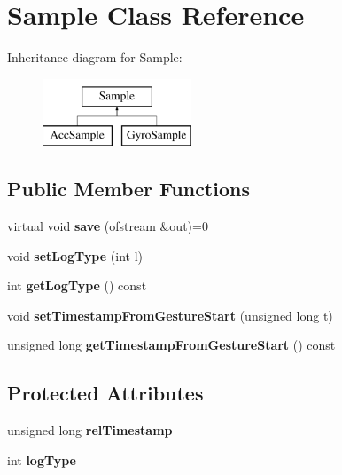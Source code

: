 \hypertarget{class_sample}{\section{\-Sample \-Class \-Reference}
\label{class_sample}
}
\-Inheritance diagram for \-Sample\-:\begin{figure}[H]
\begin{center}
\leavevmode
\includegraphics[height=2.000000cm]{class_sample}
\end{center}
\end{figure}
\subsection*{\-Public \-Member \-Functions}
\begin{DoxyCompactItemize}
\item 
\hypertarget{class_sample_a4f65c4a8bb86396782450121c7dc5ba5}{virtual void {\bfseries save} (ofstream \&out)=0}\label{class_sample_a4f65c4a8bb86396782450121c7dc5ba5}

\item 
\hypertarget{class_sample_ae728243bef5e290d46a2851ea2ce5fe2}{void {\bfseries set\-Log\-Type} (int l)}\label{class_sample_ae728243bef5e290d46a2851ea2ce5fe2}

\item 
\hypertarget{class_sample_aafff0e8223f3eafa001611a63f194c8a}{int {\bfseries get\-Log\-Type} () const }\label{class_sample_aafff0e8223f3eafa001611a63f194c8a}

\item 
\hypertarget{class_sample_a05edd06782fa94517b8daeb29e12057d}{void {\bfseries set\-Timestamp\-From\-Gesture\-Start} (unsigned long t)}\label{class_sample_a05edd06782fa94517b8daeb29e12057d}

\item 
\hypertarget{class_sample_a94a34fe92c0f8a89485042aaea458d94}{unsigned long {\bfseries get\-Timestamp\-From\-Gesture\-Start} () const }\label{class_sample_a94a34fe92c0f8a89485042aaea458d94}

\end{DoxyCompactItemize}
\subsection*{\-Protected \-Attributes}
\begin{DoxyCompactItemize}
\item 
\hypertarget{class_sample_a24ea733ab0a815949a57aca2a4740e33}{unsigned long {\bfseries rel\-Timestamp}}\label{class_sample_a24ea733ab0a815949a57aca2a4740e33}

\item 
\hypertarget{class_sample_a3a6454628c790459f41de5c83bf3ec7c}{int {\bfseries log\-Type}}\label{class_sample_a3a6454628c790459f41de5c83bf3ec7c}

\end{DoxyCompactItemize}


